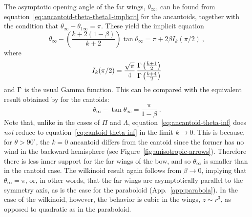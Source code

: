 The asymptotic opening angle
of the far wings, \(\theta_\infty\), can be found from
equation~\eqref{eq:ancantoid-theta-theta1-implicit} for the
ancantoids, together with the condition that
\(\theta_\infty + \theta_{1\infty} = \pi\).  These yield the implicit equation
\begin{equation}
  \label{eq:ancantoid-theta-inf}
  \theta_\infty - \left( \frac {k + 2 (1 - \beta)} {k + 2} \right) \tan \theta_\infty
  = \pi + 2 \beta I_k(\pi/2) \ ,
\end{equation}
where
\begin{equation}
  I_k(\pi/2) = \frac{\sqrt \pi}{4} \,
      \frac{  \operatorname{\Gamma}\left( \frac{k+1}{2} \right)} {\operatorname{\Gamma}\left(\frac{k+4}{2}\right)}
\end{equation}
and \(\operatorname{\Gamma}\) is the usual Gamma function.  This can be compared with the equivalent result obtained by \CRW{} for the cantoids:
\begin{equation}
  \label{eq:cantoid-theta-inf}
  \theta_\infty - \tan \theta_\infty = \frac{\pi}{1 - \beta} \ .
\end{equation}
Note that, unlike in the cases of \(\Pi\) and \(\Lambda\),
equation~\eqref{eq:ancantoid-theta-inf} does \emph{not} reduce to
equation~\eqref{eq:cantoid-theta-inf} in the limit \(k \to 0\).  This is
because, for \(\theta > 90^\circ\), the \(k = 0\) ancantoid differs from the
cantoid since the former has no wind in the backward hemisphere (see
Figure~\ref{fig:anisotropic-arrows}).  Therefore there is less inner
support for the far wings of the bow, and so \(\theta_\infty\) is smaller than
in the cantoid case.  The wilkinoid result again follows from
\(\beta \to 0\), implying that \(\theta_\infty = \pi\), or, in other words, that the far
wings are asymptotically parallel to the symmetry axis, as is the case
for the paraboloid (App.~\ref{app:parabola}).  In the case of the
wilkinoid, however, the behavior is cubic in the wings,
\(z \sim r^3\), as opposed to quadratic as in the paraboloid.
